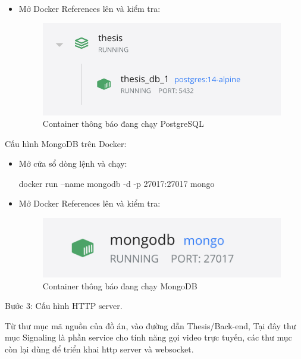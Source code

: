 \documentclass[../DoAn.tex]{subfiles}
\begin{document}
\begin{itemize}
    \item Mở Docker References lên và kiểm tra:
        \begin{figure}[H]
            \centering
            \includegraphics[width=1\linewidth]{Hinhve/Deploy/PostgreSQL_Running_Status.png}  
            \caption{Container thông báo đang chạy PostgreSQL}
            \label{fig:use_case_tổng_quan}
        \end{figure}
    
\end{itemize}

Cấu hình MongoDB trên Docker:
\begin{itemize}
    \item Mở cửa sổ dòng lệnh và chạy:
    
    docker run --name mongodb -d -p 27017:27017 mongo
    
    \item Mở Docker References lên và kiểm tra:
        \begin{figure}[H]
            \centering
            \includegraphics[width=1\linewidth]{Hinhve/Deploy/MongoDB_Running_Status.png}  
            \caption{Container thông báo đang chạy MongoDB}
            \label{fig:use_case_tổng_quan}
        \end{figure}
        
\end{itemize}

Bước 3: Cấu hình HTTP server.

Từ thư mục mã nguồn của đồ án, vào đường dẫn Thesis/Back-end, Tại đây thư mục Signaling là phần service cho tính năng gọi video trực tuyến, các thư mục còn lại dùng để triển khai http server và websocket.
\end{document}
